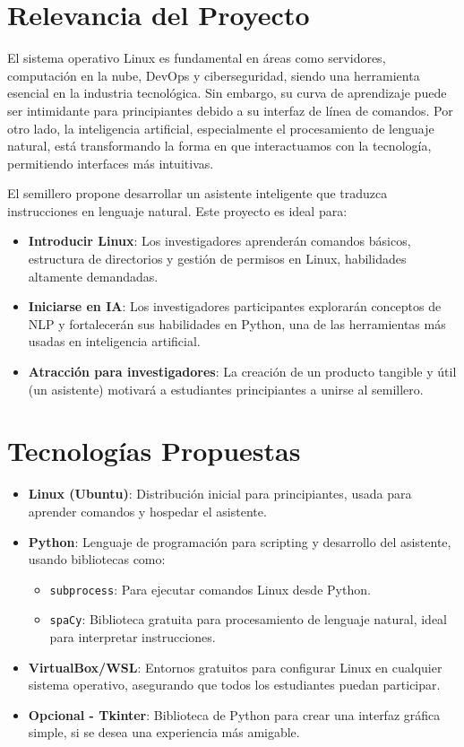 \documentclass[conference, a4paper]{IEEEtran}
\begin{document}
\section{Relevancia del Proyecto}
El sistema operativo Linux es fundamental en áreas como servidores, computación en la nube, DevOps y ciberseguridad, siendo una herramienta esencial 
en la industria tecnológica. Sin embargo, su curva de aprendizaje puede ser intimidante para principiantes debido a su interfaz de línea de comandos. 
Por otro lado, la inteligencia artificial, especialmente el procesamiento de lenguaje natural, está transformando la forma en que interactuamos con 
la tecnología, permitiendo interfaces más intuitivas.

El semillero propone desarrollar un asistente inteligente que traduzca instrucciones en lenguaje natural. Este proyecto es ideal para:
\begin{itemize}
    \item \textbf{Introducir Linux}: Los investigadores aprenderán comandos básicos, estructura de directorios y gestión de permisos en Linux, 
                                     habilidades altamente demandadas.
    \item \textbf{Iniciarse en IA}: Los investigadores participantes explorarán conceptos de NLP y fortalecerán sus habilidades en Python, 
                                    una de las herramientas más usadas en inteligencia artificial.
    \item \textbf{Atracción para investigadores}: La creación de un producto tangible y útil (un asistente) motivará a estudiantes principiantes
                                                  a unirse al semillero.
\end{itemize}

\section{Tecnologías Propuestas}
\begin{itemize}
    \item \textbf{Linux (Ubuntu)}: Distribución inicial para principiantes, usada para aprender comandos y hospedar el asistente.
    \item \textbf{Python}: Lenguaje de programación para scripting y desarrollo del asistente, usando bibliotecas como:
        \begin{itemize}
            \item \texttt{subprocess}: Para ejecutar comandos Linux desde Python.
            \item \texttt{spaCy}: Biblioteca gratuita para procesamiento de lenguaje natural, ideal para interpretar instrucciones.
        \end{itemize}
    \item \textbf{VirtualBox/WSL}: Entornos gratuitos para configurar Linux en cualquier sistema operativo, asegurando que todos los estudiantes
                                   puedan participar.
    \item \textbf{Opcional - Tkinter}: Biblioteca de Python para crear una interfaz gráfica simple, si se desea una experiencia más amigable.
\end{itemize}
\end{document}
